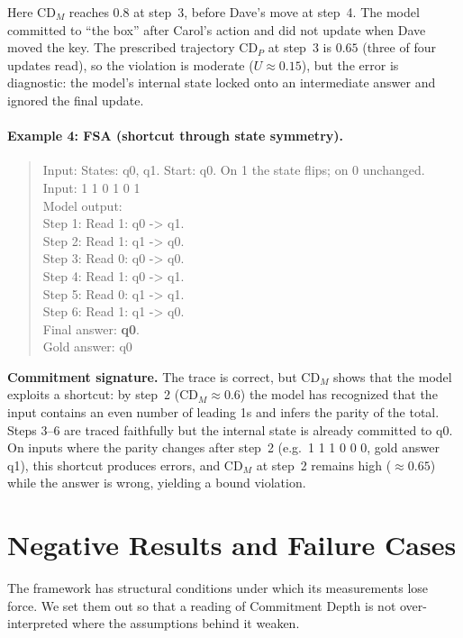 \documentclass[11pt]{article}
\newcommand{\CDP}{\mathrm{CD}_{P}}
\newcommand{\CDM}{\mathrm{CD}_{M}}
\begin{document}
\noindent Here $\CDM$ reaches $0.8$ at step~3, before Dave's move at step~4.
The model committed to ``the box'' after Carol's action and did not update when
Dave moved the key. The prescribed trajectory $\CDP$ at step~3 is $0.65$ (three
of four updates read), so the violation is moderate ($U \approx 0.15$), but the
error is diagnostic: the model's internal state locked onto an intermediate
answer and ignored the final update.

\paragraph{Example 4: FSA (shortcut through state symmetry).}

\begin{quote}\small\ttfamily
Input: States: q0, q1. Start: q0. On 1 the state flips; on
0 unchanged. Input: 1 1 0 1 0 1\\[3pt]
Model output:\\
Step 1: Read 1: q0 -> q1.\\
Step 2: Read 1: q1 -> q0.\\
Step 3: Read 0: q0 -> q0.\\
Step 4: Read 1: q0 -> q1.\\
Step 5: Read 0: q1 -> q1.\\
Step 6: Read 1: q1 -> q0.\\
Final answer: \textbf{q0}.\\
Gold answer: q0
\end{quote}

\noindent\textbf{Commitment signature.} The trace is correct, but $\CDM$ shows
that the model exploits a shortcut: by step~2 ($\CDM \approx 0.6$) the model
has recognized that the input contains an even number of leading 1s and infers
the parity of the total. Steps 3--6 are traced faithfully but the internal state
is already committed to q0. On inputs where the parity changes after step~2
(e.g.\ 1 1 1 0 0 0, gold answer q1), this shortcut produces errors, and $\CDM$
at step~2 remains high ($\approx 0.65$) while the answer is wrong, yielding a
bound violation.

\section{Negative Results and Failure Cases}
\label{app:negative}

The framework has structural conditions under which its measurements lose force.
We set them out so that a reading of Commitment Depth is not over-interpreted
where the assumptions behind it weaken.
\end{document}
